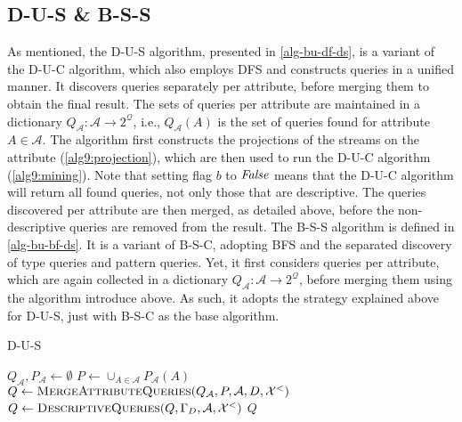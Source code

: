 \subsection{D-U-S \& B-S-S}
As mentioned, the D-U-S algorithm, presented in \autoref{alg-bu-df-ds}, is a
variant of the D-U-C algorithm, which also
employs DFS and constructs queries in a unified manner.
It discovers queries separately per attribute, before merging
them to obtain the
final result. The sets of queries per attribute are maintained in a
dictionary $Q_{\mathcal{A}}: \mathcal{A} \rightarrow 2^{\mathcal{Q}}$, i.e.,
$Q_{\mathcal{A}}(A)$ is the set of queries found for attribute $A\in
\mathcal{A}$. The algorithm first constructs the projections of the streams
on the attribute (\autoref{alg9:projection}), which are then used to run the
D-U-C algorithm (\autoref{alg9:mining}). Note that setting flag $b$ to
$\mathit{False}$ means that the D-U-C algorithm will return all found queries, not
only those that are descriptive. The queries discovered per attribute are
then merged, as detailed above, before the non-descriptive queries are
removed from the result.
The B-S-S algorithm is defined in \autoref{alg-bu-bf-ds}. It is a variant of
B-S-C, adopting BFS and the separated
discovery of type queries and pattern queries. Yet, it first considers
queries per attribute, which are again collected in a
dictionary $Q_{\mathcal{A}}: \mathcal{A} \rightarrow 2^{\mathcal{Q}}$,
before merging them using the algorithm introduce above. As such, it
adopts the strategy explained above for D-U-S, just with B-S-C as the base
algorithm.
\begin{algorithm}[t]
	\footnotesize
	\caption{D-U-S}
	\label{alg-bu-df-ds}
	\BlankLine
	$\mathit{Q_{\mathcal{A}}, P_{\mathcal{A}} \leftarrow \emptyset}$\;
	$P \leftarrow \cup_{A\in\mathcal{A}} P_\mathcal{A}(A)$\;
	$Q \leftarrow
	\textsc{MergeAttributeQueries}(Q_{\mathcal{A}},P,\mathcal{A},D,\mathcal{X}^<)$\;
	$Q \leftarrow
	\textsc{DescriptiveQueries}(Q,\Gamma_D,\mathcal{A},\mathcal{X}^<)$\;
	\Return $\mathit{Q}$\;
\end{algorithm}
